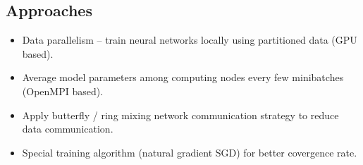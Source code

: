 \documentclass[landscape,final,archE1,fontscale=0.32]{baposter}
\begin{document}
\begin{poster}
{\subsection*{Approaches}
\begin{itemize}
\setlength \itemsep{0.2em}
\item Data parallelism -- train neural networks locally using partitioned data (GPU based).
\item Average model parameters among computing nodes every few minibatches (OpenMPI based).
\item Apply butterfly / ring mixing network communication strategy to reduce data communication.
\item Special training algorithm (natural gradient SGD) for better covergence rate.
\end{itemize}
}


  


\end{poster}
\end{document}
